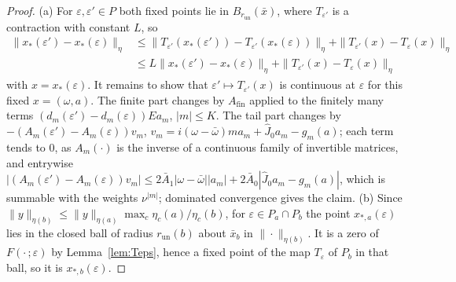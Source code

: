 \documentclass[11pt]{article}
\theoremstyle{definition}
\begin{document}
\begin{proof}
(a) For $\varepsilon, \varepsilon' \in P$ both fixed points lie in $B_{r_{\mathrm{un}}}(\bar x)$, where $T_{\varepsilon'}$ is a contraction with constant $L$, so
\begin{align*}
\|x_*(\varepsilon') - x_*(\varepsilon)\|_\eta &\le \|T_{\varepsilon'}(x_*(\varepsilon')) - T_{\varepsilon'}(x_*(\varepsilon))\|_\eta + \|T_{\varepsilon'}(x) - T_\varepsilon(x)\|_\eta\\
&\le L\|x_*(\varepsilon') - x_*(\varepsilon)\|_\eta + \|T_{\varepsilon'}(x) - T_\varepsilon(x)\|_\eta
\end{align*}
with $x = x_*(\varepsilon)$. It remains to show that $\varepsilon' \mapsto T_{\varepsilon'}(x)$ is continuous at $\varepsilon$ for this fixed $x = (\omega, a)$. The finite part changes by $A_{\mathrm{fin}}$ applied to the finitely many terms $(d_m(\varepsilon') - d_m(\varepsilon))Ea_m$, $|m| \le K$. The tail part changes by $-(A_m(\varepsilon') - A_m(\varepsilon))v_m$, $v_m = i(\omega - \bar\omega)ma_m + \hat J_0a_m - g_m(a)$; each term tends to $0$, as $A_m(\cdot)$ is the inverse of a continuous family of invertible matrices, and entrywise $|(A_m(\varepsilon') - A_m(\varepsilon))v_m| \le 2\bar A_1|\omega - \bar\omega||a_m| + 2\bar A_0|\hat J_0a_m - g_m(a)|$, which is summable with the weights $\nu^{|m|}$; dominated convergence gives the claim.
(b) Since $\|y\|_{\eta(b)} \le \|y\|_{\eta(a)}\max_c\eta_c(a)/\eta_c(b)$, for $\varepsilon \in P_a \cap P_b$ the point $x_{*,a}(\varepsilon)$ lies in the closed ball of radius $r_{\mathrm{un}}(b)$ about $\bar x_b$ in $\|\cdot\|_{\eta(b)}$. It is a zero of $F(\cdot\,;\varepsilon)$ by Lemma~\ref{lem:Teps}, hence a fixed point of the map $T_\varepsilon$ of $P_b$ in that ball, so it is $x_{*,b}(\varepsilon)$.
\end{proof}
\end{document}
